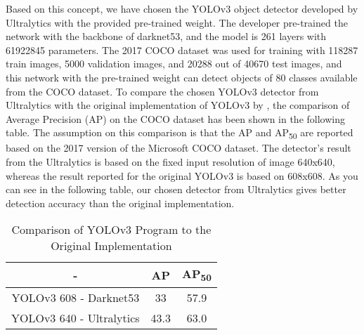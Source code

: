 Based on this concept, we have chosen the YOLOv3 object detector developed by Ultralytics \cite{jocher_ultralyticsyolov3_2021} with the provided pre-trained weight. The developer \citeauthor{jocher_ultralyticsyolov3_2021} pre-trained the network with the backbone of darknet53, and the model is 261 layers with 61922845 parameters. The 2017 COCO dataset was used for training with 118287 train images, 5000 validation images, and 20288 out of 40670 test images, and this network with the pre-trained weight can detect objects of 80 classes available from the COCO dataset. To compare the chosen YOLOv3 detector from Ultralytics with the original implementation of YOLOv3 by \citeauthor{redmon_yolov3_2018}, the comparison of Average Precision (AP) on the COCO dataset has been shown in the following table. The assumption on this comparison is that the AP and AP\textsubscript{50} are reported based on the 2017 version of the Microsoft COCO dataset. The detector's result from the Ultralytics is based on the fixed input resolution of image 640x640, whereas the result reported for the original YOLOv3 is based on 608x608. As you can see in the following table, our chosen detector from Ultralytics gives better detection accuracy than the original implementation.

\begin{table}[]
    \centering
    \caption{Comparison of YOLOv3 Program to the Original Implementation}
     \begin{tabular}{||c | c c||} 
     \hline
      - & AP & AP\textsubscript{50} \\ [0.5ex]
     \hline\hline
      YOLOv3 608 - Darknet53 & 33 & 57.9\\ 
     \hline
     YOLOv3 640 - Ultralytics & 43.3 & 63.0 \\
     \hline
    \end{tabular}
    \label{tab:yolov3}
\end{table}
